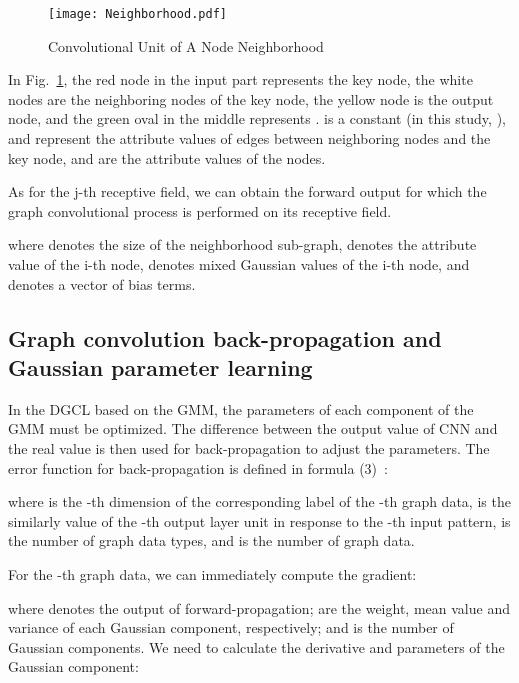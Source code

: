 \documentclass[11pt]{article}
\begin{document}
\begin{figure}
\vspace{-0.1in}
\centering
\texttt{[image: Neighborhood.pdf]}
\vspace{-0.1in}
\caption{Convolutional Unit of A Node Neighborhood}\label{fig:CUAN}
\vspace{-0.2in}
\end{figure}


In Fig.~\ref{fig:CUAN}, the red node in the input part represents the key node, the white nodes are the neighboring nodes of the key node, the yellow node is the output node, and the green oval in the middle represents .  is a constant (in this study, ), and  represent the attribute values of edges between neighboring nodes and the key node, and  are the attribute values of the nodes.


As for the j-th receptive field, we can obtain the forward output for which the graph convolutional process is performed on its receptive field.




where  denotes the size of the neighborhood sub-graph,  denotes the attribute value of the i-th node,  denotes mixed Gaussian values of the i-th node, and  denotes a vector of bias terms.


\subsection{Graph convolution back-propagation and Gaussian parameter learning}
In the DGCL based on the GMM, the parameters of each component of the GMM must be optimized. The difference between the output value of CNN and the real value is then used for back-propagation to adjust the parameters. The error function for back-propagation is defined in formula (3)~\cite{NIPS2012_4824}:



where   is the -th dimension of the corresponding label of the -th graph data,  is the similarly value of the -th output layer unit in response to the -th input pattern,  is the number of graph data types, and  is the number of graph data.





For the -th graph data, we can immediately compute the gradient:




where  denotes the output of forward-propagation;  are the weight, mean value and variance of each Gaussian component, respectively; and  is the number of Gaussian components. We need to calculate the derivative and parameters of the Gaussian component:
\end{document}
